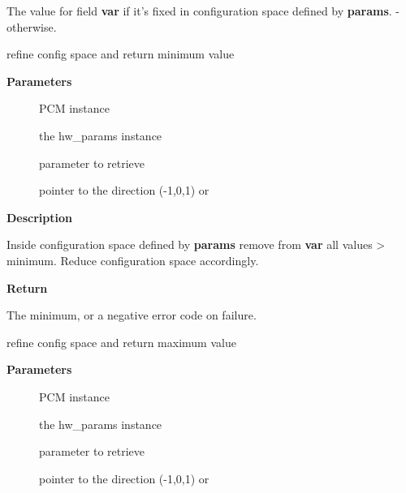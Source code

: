 \documentclass[a4paper,8pt,english]{sphinxmanual}
\begin{document}
The value for field \textbf{var} if it's fixed in configuration space
defined by \textbf{params}. - otherwise.

\begin{fulllineitems}
\label{sound/kernel-api/alsa-driver-api:c.snd_pcm_hw_param_first}
refine config space and return minimum value

\end{fulllineitems}


\textbf{Parameters}
\begin{description}
\item[{}] \leavevmode
PCM instance

\item[{}] \leavevmode
the hw\_params instance

\item[{}] \leavevmode
parameter to retrieve

\item[{}] \leavevmode
pointer to the direction (-1,0,1) or 

\end{description}

\textbf{Description}

Inside configuration space defined by \textbf{params} remove from \textbf{var} all
values \textgreater{} minimum. Reduce configuration space accordingly.

\textbf{Return}

The minimum, or a negative error code on failure.

\begin{fulllineitems}
\label{sound/kernel-api/alsa-driver-api:c.snd_pcm_hw_param_last}
refine config space and return maximum value

\end{fulllineitems}


\textbf{Parameters}
\begin{description}
\item[{}] \leavevmode
PCM instance

\item[{}] \leavevmode
the hw\_params instance

\item[{}] \leavevmode
parameter to retrieve

\item[{}] \leavevmode
pointer to the direction (-1,0,1) or 

\end{description}
\end{document}
